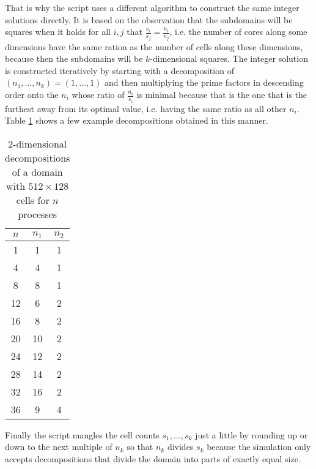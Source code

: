 That is why the script uses a different algorithm to construct the same integer
solutions directly. It is based on the observation that the subdomains will be
squares when it holds for all $i, j$ that
$\frac{s_{i}}{s_{j}} = \frac{n_{i}}{n_{j}}$, i.e. the number of cores along some
dimensions have the same ration as the number of cells along these dimensions,
because then the subdomains will be $k$-dimensional squares. The integer
solution is constructed iteratively by starting with a decomposition of
$(n_{1}, \dots, n_{k}) = (1, \dots, 1)$ and then multiplying the prime factors
in descending order onto the $n_{i}$ whose ratio of $\frac{n_{i}}{s_{i}}$ is
minimal because that is the one that is the furthest away from its optimal
value, i.e. having the same ratio as all other $n_{i}$. Table
\ref{fig:tooling-decompositions} shows a few example decompositions obtained in
this manner.

\begin{table}[h]
  \centering
  \begin{tabular}{c|cc}
    \hline
    $n$ & $n_{1}$ & $n_{2}$\\
    \hline
    1 & 1 & 1\\
    4 & 4 & 1\\
    8 & 8 & 1\\
    12 & 6 & 2\\
    16 & 8 & 2\\
    20 & 10 & 2\\
    24 & 12 & 2\\
    28 & 14 & 2\\
    32 & 16 & 2\\
    36 & 9 & 4\\
    \hline
  \end{tabular}
  \caption{2-dimensional decompositions of a domain with $512 \times 128$ cells for $n$ processes}
  \label{fig:tooling-decompositions}
\end{table}

Finally the script mangles the cell counts $s_{1}, \dots, s_{k}$ just a little
by rounding up or down to the next multiple of $n_{k}$ so that $n_{k}$ divides
$s_{k}$ because the simulation only accepts decompositions that divide the
domain into parts of exactly equal size.
